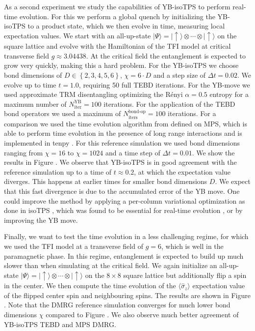 As a second experiment we study the capabilities of YB-isoTPS to perform real-time evolution. For this we perform a global quench by initializing the YB-isoTPS to a product state, which we then evolve in time, measuring local expectation values. We start with an all-up-state $|\Psi\rangle = |\uparrow\rangle\otimes\cdots\otimes|\uparrow\rangle$ on the square lattice and evolve with the Hamiltonian of the TFI model at critical transverse field $g \approx 3.04438$. At the critical field the entanglement is expected to grow very quickly, making this a hard problem. For the YB-isoTPS we choose bond dimensions of $D\in\left\{2, 3, 4, 5, 6\right\}$, $\chi = 6\cdot D$ and a step size of $\Delta t = 0.02$. We evolve up to time $t = 1.0$, requiring 50 full TEBD iterations. For the YB-move we used approximate TRM disentangling optimizing the Rényi $\alpha = 0.5$ entropy for a maximum number of $N_\text{iter}^\text{YB} = 100$ iterations. For the application of the TEBD bond operators we used a maximum of $N_\text{iters}^\text{bond-op} = 100$ iterations. For a comparison we used the time evolution algorithm from \cite{cite:time_evolving_a_mps_with_long_range_interactions} defined on MPS, which is able to perform time evolution in the presence of long range interactions and is implemented in tenpy \cite{cite:tenpy}. For this reference simulation we used bond dimensions ranging from $\chi = 16$ to $\chi= 1024$ and a time step of $\Delta t = 0.01$. We show the results in Figure . We observe that YB-isoTPS is in good agreement with the reference simulation up to a time of $t\approx0.2$, at which the expectation value diverges. This happens at earlier times for smaller bond dimensions $D$. We expect that this fast divergence is due to the accumulated error of the YB move. One could improve the method by applying a per-column variational optimization as done in isoTPS \cite{cite:isometric_tensor_network_states_in_two_dimensions, cite:efficient_simulation_of_dynamics_in_two_dimensional_quantum_spin_systems}, which was found to be essential for real-time evolution \cite{cite:efficient_simulation_of_dynamics_in_two_dimensional_quantum_spin_systems}, or by improving the YB move. \par


Finally, we want to test the time evolution in a less challenging regime, for which we used the TFI model at a transverse field of $g = 6$, which is well in the paramagnetic phase. In this regime, entanglement is expected to build up much slower than when simulating at the critical field. We again initialize an all-up-state $|\Psi\rangle = |\uparrow\rangle\otimes\cdots\otimes|\uparrow\rangle$ on the $8\times8$ square lattice but additionally flip a spin in the center. We then compute the time evolution of the $\langle\hat{\sigma}_z\rangle$ expectation value of the flipped center spin and neighbouring spins. The results are shown in Figure . Note that the DMRG reference simulation converges for much lower bond dimensions $\chi$ compared to Figure . We also observe much better agreement of YB-isoTPS TEBD and MPS DMRG.